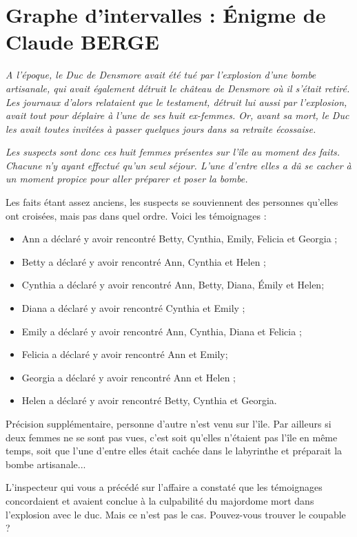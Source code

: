 \section*{Graphe d'intervalles : Énigme de Claude BERGE}
\textit{A l'époque, le Duc de Densmore avait été tué par l'explosion d'une bombe artisanale, qui avait également détruit le château de Densmore
où il s'était retiré. Les journaux d'alors relataient que le testament, détruit lui aussi par l'explosion, avait tout pour
déplaire à l'une de ses huit ex-femmes. Or, avant sa mort, le Duc les avait toutes invitées à passer quelques jours dans sa retraite écossaise.}

\textit{Les suspects sont donc ces huit femmes présentes sur l'île au moment des faits. Chacune n'y ayant effectué qu'un seul séjour. L'une d'entre elles a dû se cacher à un moment propice pour aller préparer et poser la bombe.}

Les faits étant assez anciens, les suspects se souviennent des personnes qu'elles ont croisées, mais pas dans quel ordre. Voici les témoignages :

\begin{itemize}
\item Ann a déclaré y avoir rencontré Betty, Cynthia, Emily, Felicia et Georgia ;
\item Betty a déclaré y avoir rencontré Ann, Cynthia et Helen ;
\item Cynthia a déclaré y avoir rencontré Ann, Betty, Diana, Émily et Helen;
\item Diana a déclaré y avoir rencontré Cynthia et Emily ;
\item Emily a déclaré y avoir rencontré Ann, Cynthia, Diana et Felicia ;
\item Felicia a déclaré y avoir rencontré Ann et Emily;
\item Georgia a déclaré y avoir rencontré Ann et Helen ;
\item Helen a déclaré y avoir rencontré Betty, Cynthia et Georgia.
\end{itemize}

\medskip 
Précision supplémentaire, personne d'autre n'est venu sur l'île. Par ailleurs si deux femmes ne se sont pas vues,
c'est soit qu'elles n'étaient pas l'île en même temps, soit que l'une d'entre elles était cachée dans le labyrinthe et préparait la bombe artisanale... 


\begin{question}
L'inspecteur qui vous a précédé sur l'affaire a constaté que les témoignages concordaient et avaient conclue
à la culpabilité du majordome mort dans l'explosion avec le duc. Mais ce n'est pas le cas. Pouvez-vous trouver le coupable ?
\end{question}

